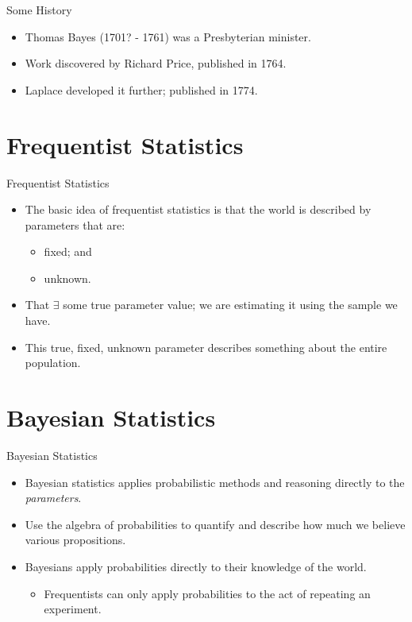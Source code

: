 \documentclass[dvipsnames,mathserif, handout]{beamer}
\begin{document}
{\begin{frame}{Some History}
\begin{itemize}
	\item Thomas Bayes (1701? - 1761) was a Presbyterian minister.
	\item Work discovered by Richard Price, published in 1764.
	\item Laplace developed it further; published in 1774.
\end{itemize}

\end{frame}


\section{Frequentist Statistics}

\begin{frame}{Frequentist Statistics}
    \begin{itemize}
    	\item The basic idea of frequentist statistics is that the world is described by parameters that are:
    	\begin{itemize}
        		\item fixed; and
    		\item unknown.
    	\end{itemize}
    	\item That $\exists$ some true parameter value; we are estimating it using the sample we have.
    	\item This true, fixed, unknown parameter describes something about the entire population.
    \end{itemize}
\end{frame}

\section{Bayesian Statistics}


\begin{frame}{Bayesian Statistics}
    \begin{itemize}
    	\item Bayesian statistics applies probabilistic methods and reasoning directly to the \textit{parameters}.
    	\item Use the algebra of probabilities to quantify and describe how much we believe various propositions.
	\item Bayesians apply probabilities directly to their knowledge of the world.
	\begin{itemize}
		\item \footnotesize Frequentists can only apply probabilities to the act of repeating an experiment.
	\end{itemize}
    \end{itemize}	
\end{frame}

}
\end{document}

